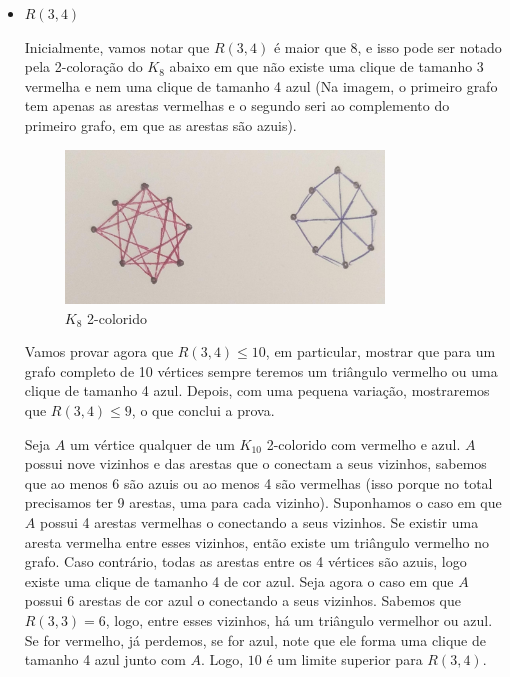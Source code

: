 \documentclass{article}
\begin{document}
\begin{itemize}
\begin{itemize}
		      \item \(R(3, 4)\)

		            Inicialmente, vamos notar que \(R(3, 4)\) é maior que 8, e isso pode ser notado pela 2-coloração do \(K_8\) abaixo em que
		            não existe uma clique de tamanho 3 vermelha e nem uma clique de tamanho 4 azul (Na imagem, o primeiro grafo tem apenas as arestas vermelhas
		            e o segundo seri ao complemento do primeiro grafo, em que as arestas são azuis).

		            \begin{figure}[H]
			            \centering
			            \includegraphics[width=0.8\textwidth]{images/1b.jpeg}
			            \caption{\(K_8\) 2-colorido}
		            \end{figure}

		            Vamos provar agora que \(R(3, 4) \leq 10\), em particular, mostrar que para um grafo completo de 10 vértices sempre teremos um triângulo
		            vermelho ou uma clique de tamanho 4 azul. Depois, com uma pequena variação, mostraremos que \(R(3,4) \leq 9\), o que conclui a prova.

		            Seja \(A\) um vértice qualquer de um \(K_{10}\) 2-colorido com vermelho e azul. \(A\) possui nove vizinhos e das arestas que o conectam a seus vizinhos,
		            sabemos que ao menos 6 são azuis ou ao menos 4 são vermelhas (isso porque no total precisamos ter 9 arestas, uma para cada vizinho). Suponhamos o caso em que
		            \(A\) possui 4 arestas vermelhas o conectando a seus vizinhos. Se existir uma aresta vermelha entre esses vizinhos, então existe um triângulo vermelho no grafo. Caso
		            contrário, todas as arestas entre os 4 vértices são azuis, logo existe uma clique de tamanho 4 de cor azul. Seja agora o caso em que \(A\) possui
		            6 arestas de cor azul o conectando a seus vizinhos. Sabemos que \(R(3, 3) = 6\), logo, entre esses vizinhos, há um triângulo vermelhor ou azul. Se for vermelho,
		            já perdemos, se for azul, note que ele forma uma clique de tamanho 4 azul junto com \(A\). Logo, \(10\) é um limite superior para \(R(3, 4)\).


\end{itemize}
\end{itemize}
\end{document}
